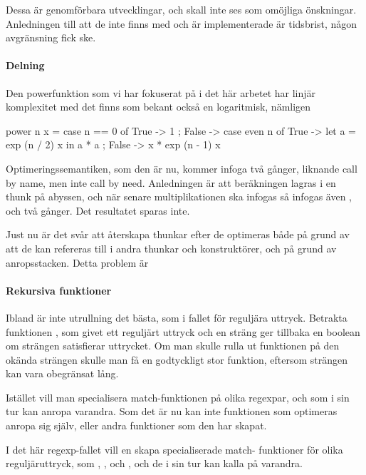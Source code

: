 \documentclass[Rapport]{subfiles}
\begin{document}
Dessa är genomförbara utvecklingar, och skall inte ses som omöjliga önskningar.
Anledningen till att de inte finns med och är implementerade är tidsbrist,
någon avgränsning fick ske.

\paragraph{Delning}
Den powerfunktion som vi har fokuserat på i det här arbetet har linjär
komplexitet med det finns som bekant också en logaritmisk, nämligen

\begin{codeEx}
power n x = case n == 0 of
    { True  -> 1
    ; False -> case even n of
        { True  -> let a = exp (n / 2) x 
                   in  a * a
        ; False -> x * exp (n - 1) x
        }
    }
\end{codeEx}

Optimeringssemantiken, som den är nu, kommer infoga  två gånger,
liknande call by name, men inte call by need. Anledningen är att beräkningen
 lagras i en thunk på abyssen, och när senare multiplikationen ska
infogas så infogas även , och två gånger. Det resultatet sparas
inte.

    Just nu är det svår att återskapa thunkar efter de optimeras både på grund
av att de kan refereras till i andra thunkar och konstruktörer, och på grund
av anropsstacken. Detta problem är 

\paragraph{Rekursiva funktioner}
\label{sec:future-regexp}
Ibland är inte utrullning det bästa, som i fallet för reguljära uttryck.
Betrakta funktionen , som givet
ett reguljärt uttryck och en sträng ger tillbaka en boolean om strängen
satisfierar uttrycket. Om man skulle rulla ut funktionen på den okända strängen
skulle man få en godtyckligt stor funktion, eftersom strängen kan vara 
obegränsat lång.

    Istället vill man specialisera match-funktionen på olika regexpar, och
som i sin tur kan anropa varandra. Som det är nu kan inte funktionen som
optimeras anropa sig själv, eller andra funktioner som den har skapat.

    I det här regexp-fallet vill en skapa specialiserade match-
funktioner för olika reguljäruttryck, 
som , ,  och , och de i sin tur
kan kalla på varandra.
\end{document}
